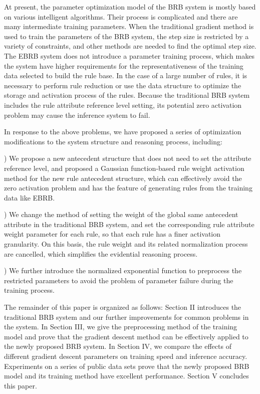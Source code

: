 \documentclass{ieeeaccess}
\begin{document}
At present, the parameter optimization model of the BRB system is mostly based on various intelligent algorithms. Their process is
complicated and there are many intermediate training parameters. When the traditional gradient method is used to train the parameters
of the BRB system, the step size is restricted by a variety of constraints, and other methods are needed to find the optimal step size.
The EBRB system does not introduce a parameter training process, which makes the system have higher requirements for the representativeness
of the training data selected to build the rule base. In the case of a large number of rules, it is necessary to perform rule reduction or
use the data structure to optimize the storage and activation process of the rules. Because the traditional BRB system includes the rule attribute
reference level setting, its potential zero activation problem may cause the inference system to fail.

In response to the above problems, we have proposed a series of optimization modifications to the system structure and reasoning process, including:

) We propose a new antecedent structure that does not need to set the attribute reference level, and proposed a Gaussian function-based
rule weight activation method for the new rule antecedent structure, which can effectively avoid the zero activation problem and has the feature of
generating rules from the training data like EBRB.

) We change the method of setting the weight of the global same antecedent attribute in the
traditional BRB system, and set the corresponding rule attribute weight parameter for each rule, so that each rule has a finer activation granularity.
On this basis, the rule weight and its related normalization process are cancelled, which simplifies the evidential reasoning process.

) We further introduce the normalized exponential function to preprocess the restricted parameters to avoid the problem of
parameter failure during the training process.

The remainder of this paper is organized as follows: Section II introduces the traditional BRB system and our further improvements for common problems in the system.
In Section III, we give the preprocessing method of the training model and prove that the gradient descent method can be effectively applied to the newly proposed BRB system.
In Section IV, we compare the effects of different gradient descent parameters on training speed and inference accuracy. Experiments on a series of public data sets prove that
the newly proposed BRB model and its training method have excellent performance. Section V concludes this paper.
\end{document}
